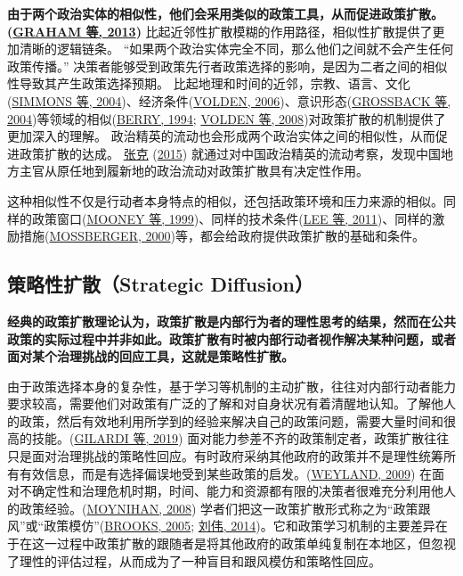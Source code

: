 \documentclass[
  12pt,
]{ctexart}
\begin{document}
\textbf{由于两个政治实体的相似性，他们会采用类似的政策工具，从而促进政策扩散。(\protect\hyperlink{ref-GrahamEtAl2013}{GRAHAM 等, 2013})}
比起近邻性扩散模糊的作用路径，相似性扩散提供了更加清晰的逻辑链条。
``如果两个政治实体完全不同，那么他们之间就不会产生任何政策传播。''
决策者能够受到政策先行者政策选择的影响，是因为二者之间的相似性导致其产生政策选择预期。
比起地理和时间的近邻，宗教、语言、文化(\protect\hyperlink{ref-SimmonsElkins2004}{SIMMONS 等, 2004})、经济条件(\protect\hyperlink{ref-Volden2006}{VOLDEN, 2006})、意识形态(\protect\hyperlink{ref-GrossbackEtAl2004a}{GROSSBACK 等, 2004})等领域的相似(\protect\hyperlink{ref-Berry1994}{BERRY, 1994}; \protect\hyperlink{ref-VoldenEtAl2008}{VOLDEN 等, 2008})对政策扩散的机制提供了更加深入的理解。
政治精英的流动也会形成两个政治实体之间的相似性，从而促进政策扩散的达成。
\protect\hyperlink{ref-ZhangKe2015}{张克} (\protect\hyperlink{ref-ZhangKe2015}{2015}) 就通过对中国政治精英的流动考察，发现中国地方主官从原任地到履新地的政治流动对政策扩散具有决定性作用。

这种相似性不仅是行动者本身特点的相似，还包括政策环境和压力来源的相似。同样的政策窗口(\protect\hyperlink{ref-MooneyLee1999}{MOONEY 等, 1999})、同样的技术条件(\protect\hyperlink{ref-LeeEtAl2011}{LEE 等, 2011})、同样的激励措施(\protect\hyperlink{ref-Mossberger2000}{MOSSBERGER, 2000})等，都会给政府提供政策扩散的基础和条件。

\hypertarget{ux7b56ux7565ux6027ux6269ux6563strategic-diffusion}{%
\subsection{策略性扩散（Strategic Diffusion）}\label{ux7b56ux7565ux6027ux6269ux6563strategic-diffusion}}

\textbf{经典的政策扩散理论认为，政策扩散是内部行为者的理性思考的结果，然而在公共政策的实际过程中并非如此。政策扩散有时被内部行动者视作解决某种问题，或者面对某个治理挑战的回应工具，这就是策略性扩散。}

由于政策选择本身的复杂性，基于学习等机制的主动扩散，往往对内部行动者能力要求较高，需要他们对政策有广泛的了解和对自身状况有着清醒地认知。了解他人的政策，然后有效地利用所学到的经验来解决自己的政策问题，需要大量时间和很高的技能。(\protect\hyperlink{ref-GilardiWasserfallen2019}{GILARDI 等, 2019})
面对能力参差不齐的政策制定者，政策扩散往往只是面对治理挑战的策略性回应。有时政府采纳其他政府的政策并不是理性统筹所有有效信息，而是有选择偏误地受到某些政策的启发。(\protect\hyperlink{ref-Weyland2009}{WEYLAND, 2009}) 在面对不确定性和治理危机时期，时间、能力和资源都有限的决策者很难充分利用他人的政策经验。(\protect\hyperlink{ref-Moynihan2008}{MOYNIHAN, 2008}) 学者们把这一政策扩散形式称之为``政策跟风''或``政策模仿''(\protect\hyperlink{ref-Brooks2005}{BROOKS, 2005}; \protect\hyperlink{ref-LiuWei2014}{刘伟, 2014})。它和政策学习机制的主要差异在于在这一过程中政策扩散的跟随者是将其他政府的政策单纯复制在本地区，但忽视了理性的评估过程，从而成为了一种盲目和跟风模仿和策略性回应。
\end{document}
